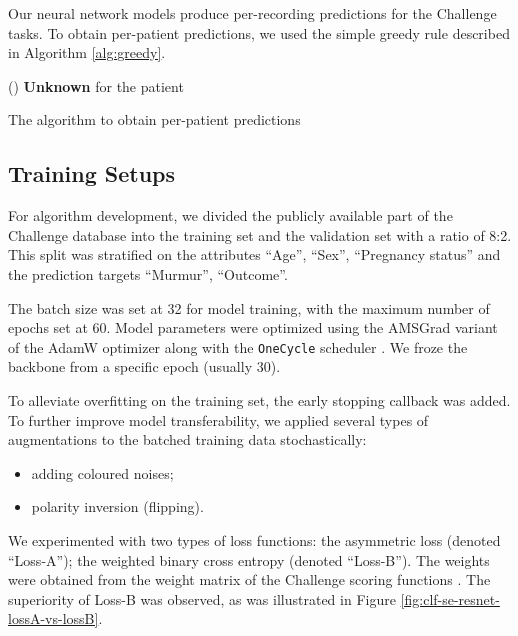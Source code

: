 

Our neural network models produce per-recording predictions for the Challenge tasks. To obtain per-patient predictions, we used the simple greedy rule described in Algorithm \ref{alg:greedy}.

\begin{algorithm}
\SetInd{0.2em}{2em}
\Else(){
    \textbf{Unknown} for the patient\;
}
\caption{The algorithm to obtain per-patient predictions}\label{alg:greedy}
\end{algorithm}

\subsection{Training Setups}
\label{subsec:training}

For algorithm development, we divided the publicly available part of the Challenge database into the training set and the validation set with a ratio of 8:2. This split was stratified on the attributes ``Age'', ``Sex'', ``Pregnancy status'' and the prediction targets ``Murmur'', ``Outcome''.

The batch size was set at 32 for model training, with the maximum number of epochs set at 60. Model parameters were optimized using the AMSGrad variant of the AdamW optimizer \cite{adamw_amsgrad} along with the \texttt{OneCycle} scheduler \cite{smith2019one_cycle}. We froze the backbone from a specific epoch (usually 30).

To alleviate overfitting on the training set, the early stopping callback was added. To further improve model transferability, we applied several types of augmentations to the batched training data stochastically:
\begin{itemize}
    \item adding coloured noises;
    \item polarity inversion (flipping).
\end{itemize}

We experimented with two types of loss functions: the asymmetric loss (denoted ``Loss-A''); the weighted binary cross entropy (denoted ``Loss-B''). The weights were obtained from the weight matrix of the Challenge scoring functions \cite{cinc2022}. The superiority of Loss-B was observed, as was illustrated in Figure \ref{fig:clf-se-resnet-lossA-vs-lossB}.

